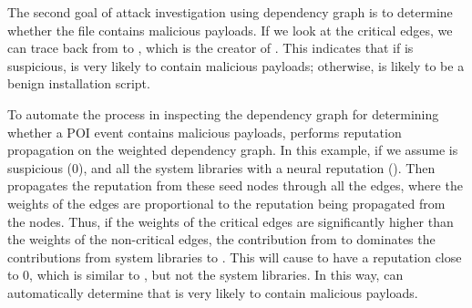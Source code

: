{
The second goal of attack investigation using dependency graph is to determine whether the file  contains malicious payloads. 
If we look at the critical edges, we can trace back from  to , which is the creator of .
This indicates that if  is suspicious,  is very likely to contain malicious payloads; otherwise,  is likely to be a benign installation script.

To automate the process in inspecting the dependency graph for determining whether a POI event contains malicious payloads, \tool performs reputation propagation on the weighted dependency graph.
In this example, if we assume  is suspicious (\ie $0$), and all the system libraries with a neural reputation ().
Then \tool propagates the reputation from these seed nodes through all the edges, where the weights of the edges are proportional to the reputation being propagated from the nodes.
Thus, if the weights of the critical edges are significantly higher than the weights of the non-critical edges, the contribution from  to  dominates the contributions from system libraries to .
This will cause  to have a reputation close to 0, which is similar to , but not the system libraries.
In this way, \tool can automatically determine that  is very likely to contain malicious payloads.
}